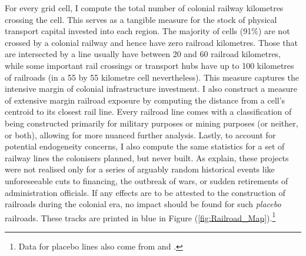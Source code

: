 \documentclass[11pt, oneside]{article}   	%
\let\oldref\ref
\renewcommand{\ref}[1]{(\oldref{#1})}
\begin{document}
For every grid cell, I compute the total number of colonial railway kilometres crossing the cell. This serves as a tangible measure for the stock of physical transport capital invested into each region. The majority of cells (91\%) are not crossed by a colonial railway and hence have zero railroad kilometres. Those that are intersected by a line usually have between 20 and 60 railroad kilometres, while some important rail crossings or transport hubs have up to 100 kilometres of railroads (in a 55 by 55 kilometre cell nevertheless). This measure captures the intensive margin of colonial infrastructure investment. I also construct a measure of extensive margin railroad exposure by computing the distance from a cell's centroid to its closest rail line. Every railroad line comes with a classification of being constructed primarily for military purposes or mining purposes (or neither, or both), allowing for more nuanced further analysis. Lastly, to account for potential endogeneity concerns, I also compute the same statistics for a set of railway lines the colonisers planned, but never built. As \cite{jedwab_permanent_2016} explain, these projects were not realised only for a series of arguably random historical events like unforeseeable cuts to financing, the outbreak of wars, or sudden retirements of administration officials. If any effects are to be attested to the construction of railroads during the colonial era, no impact should be found for such \emph{placebo} railroads. These tracks are printed in blue in Figure \ref{fig:Railroad_Map}.\footnote{Data for placebo lines also come from \cite{jedwab_permanent_2016} and \cite{Herranz-Loncan_publicbenefitRailways_2017}.}
\end{document}
